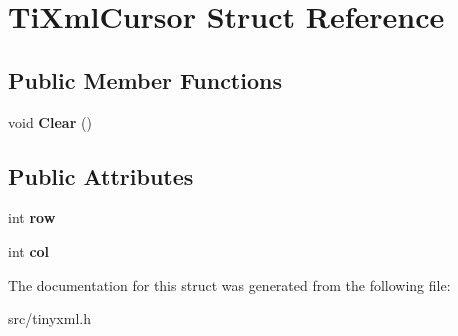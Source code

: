 \hypertarget{structTiXmlCursor}{
\section{\-Ti\-Xml\-Cursor \-Struct \-Reference}
\label{d7/dfc/structTiXmlCursor}
}
\subsection*{\-Public \-Member \-Functions}
\begin{DoxyCompactItemize}
\item 
\hypertarget{structTiXmlCursor_a1e6fa622b59dafb71b6efe595105dcdd}{
void {\bfseries \-Clear} ()}
\label{d7/dfc/structTiXmlCursor_a1e6fa622b59dafb71b6efe595105dcdd}

\end{DoxyCompactItemize}
\subsection*{\-Public \-Attributes}
\begin{DoxyCompactItemize}
\item 
\hypertarget{structTiXmlCursor_a5b54dd949820c2db061e2be41f3effb3}{
int {\bfseries row}}
\label{d7/dfc/structTiXmlCursor_a5b54dd949820c2db061e2be41f3effb3}

\item 
\hypertarget{structTiXmlCursor_a5694d7ed2c4d20109d350c14c417969d}{
int {\bfseries col}}
\label{d7/dfc/structTiXmlCursor_a5694d7ed2c4d20109d350c14c417969d}

\end{DoxyCompactItemize}


\-The documentation for this struct was generated from the following file\-:\begin{DoxyCompactItemize}
\item 
src/tinyxml.\-h\end{DoxyCompactItemize}
